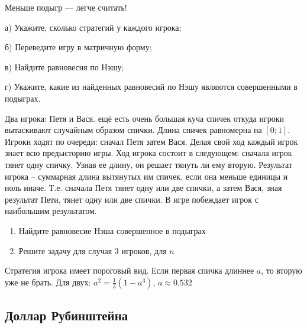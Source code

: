 \begin{problem}
 Меньше подыгр — легче считать!\par
{}
а) Укажите, сколько стратегий у каждого игрока;\par
б) Переведите игру в матричную форму;\par
в) Найдите равновесия по Нэшу;\par
г) Укажите, какие из найденных равновесий по Нэшу являются совершенными в подыграх.



\begin{sol}

\end{sol}
\end{problem}





\begin{problem}
Два игрока: Петя и Вася. ещё есть очень большая куча спичек откуда игроки вытаскивают случайным образом спички. Длина спичек равномерна на $[0;1]$. Игроки ходят по очереди: сначал Петя затем Вася. Делая свой ход каждый игрок знает всю предысторию игры. Ход игрока состоит в следующем: сначала игрок тянет одну спичку. Узнав ее длину, он решает тянуть ли ему вторую. Результат игрока -- суммарная длина вытянутых им спичек, если она меньше единицы и ноль иначе. Т.е. сначала Петя тянет одну или две спички, а затем Вася, зная результат Пети, тянет одну или две спички. В игре побеждает игрок с наибольшим результатом.
\begin{enumerate}
\item Найдите равновесие Нэша совершенное в подыграх
\item Решите задачу для случая 3 игроков, для $n$
\end{enumerate}




\begin{sol}
Стратегия игрока имеет пороговый вид. Если первая спичка длиннее $a$, то вторую уже не брать. Для двух: $a^{2}=\frac{1}{3}(1-a^{3})$, $a\approx 0.532$
\end{sol}
\end{problem}






\subsection{Доллар Рубинштейна}

